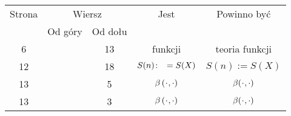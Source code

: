 \documentclass[a4paper,11pt]{article}
\numberwithin{equation}{section}
\begin{document}



\newpage



\begin{center}

  \begin{tabular}{|c|c|c|c|c|}
    \hline
    Strona & \multicolumn{2}{c|}{Wiersz} & Jest
                              & Powinno być \\ \cline{2-3}
    & Od góry & Od dołu & & \\
    \hline
    \hphantom{0}6 & & 13 & funkcji & teoria funkcji \\
    12 & & 18 & $S( n )\! : \hphantom{0} = S( X )$ & $S( n ) := S( X )$ \\
    13 & & \hphantom{0}5 & $\beta \, ( \hspace{0.05em} \cdot \hspace{0.05em} , \cdot )$
    & $\beta ( \hspace{0.05em} \cdot \hspace{0.05em} , \cdot )$ \\
    13 & & \hphantom{0}3 & $\beta \, ( \hspace{0.05em} \cdot \hspace{0.05em} , \cdot )$
    & $\beta ( \hspace{0.05em} \cdot \hspace{0.05em} , \cdot )$ \\
    \hline
  \end{tabular}

\end{center}

\VerSpaceTwo


\noindent













\printbibliography





\end{document}
